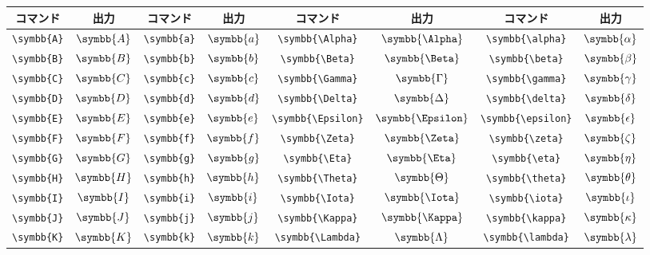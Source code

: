 \begin{longtable}{cccccccc}
    \toprule
    コマンド         & 出力          & コマンド         & 出力          & コマンド                & 出力                 & コマンド                   & 出力                    \\
    \midrule
    \verb|\symbb{A}| & \(\symbb{A}\) & \verb|\symbb{a}| & \(\symbb{a}\) & \verb|\symbb{\Alpha}|   & \(\symbb{\Alpha}\)   & \verb|\symbb{\alpha}|      & \(\symbb{\alpha}\)      \\
    \verb|\symbb{B}| & \(\symbb{B}\) & \verb|\symbb{b}| & \(\symbb{b}\) & \verb|\symbb{\Beta}|    & \(\symbb{\Beta}\)    & \verb|\symbb{\beta}|       & \(\symbb{\beta}\)       \\
    \verb|\symbb{C}| & \(\symbb{C}\) & \verb|\symbb{c}| & \(\symbb{c}\) & \verb|\symbb{\Gamma}|   & \(\symbb{\Gamma}\)   & \verb|\symbb{\gamma}|      & \(\symbb{\gamma}\)      \\
    \verb|\symbb{D}| & \(\symbb{D}\) & \verb|\symbb{d}| & \(\symbb{d}\) & \verb|\symbb{\Delta}|   & \(\symbb{\Delta}\)   & \verb|\symbb{\delta}|      & \(\symbb{\delta}\)      \\
    \verb|\symbb{E}| & \(\symbb{E}\) & \verb|\symbb{e}| & \(\symbb{e}\) & \verb|\symbb{\Epsilon}| & \(\symbb{\Epsilon}\) & \verb|\symbb{\epsilon}|    & \(\symbb{\epsilon}\)    \\
    \verb|\symbb{F}| & \(\symbb{F}\) & \verb|\symbb{f}| & \(\symbb{f}\) & \verb|\symbb{\Zeta}|    & \(\symbb{\Zeta}\)    & \verb|\symbb{\zeta}|       & \(\symbb{\zeta}\)       \\
    \verb|\symbb{G}| & \(\symbb{G}\) & \verb|\symbb{g}| & \(\symbb{g}\) & \verb|\symbb{\Eta}|     & \(\symbb{\Eta}\)     & \verb|\symbb{\eta}|        & \(\symbb{\eta}\)        \\
    \verb|\symbb{H}| & \(\symbb{H}\) & \verb|\symbb{h}| & \(\symbb{h}\) & \verb|\symbb{\Theta}|   & \(\symbb{\Theta}\)   & \verb|\symbb{\theta}|      & \(\symbb{\theta}\)      \\
    \verb|\symbb{I}| & \(\symbb{I}\) & \verb|\symbb{i}| & \(\symbb{i}\) & \verb|\symbb{\Iota}|    & \(\symbb{\Iota}\)    & \verb|\symbb{\iota}|       & \(\symbb{\iota}\)       \\
    \verb|\symbb{J}| & \(\symbb{J}\) & \verb|\symbb{j}| & \(\symbb{j}\) & \verb|\symbb{\Kappa}|   & \(\symbb{\Kappa}\)   & \verb|\symbb{\kappa}|      & \(\symbb{\kappa}\)      \\
    \verb|\symbb{K}| & \(\symbb{K}\) & \verb|\symbb{k}| & \(\symbb{k}\) & \verb|\symbb{\Lambda}|  & \(\symbb{\Lambda}\)  & \verb|\symbb{\lambda}|     & \(\symbb{\lambda}\)     \\

\end{longtable}
